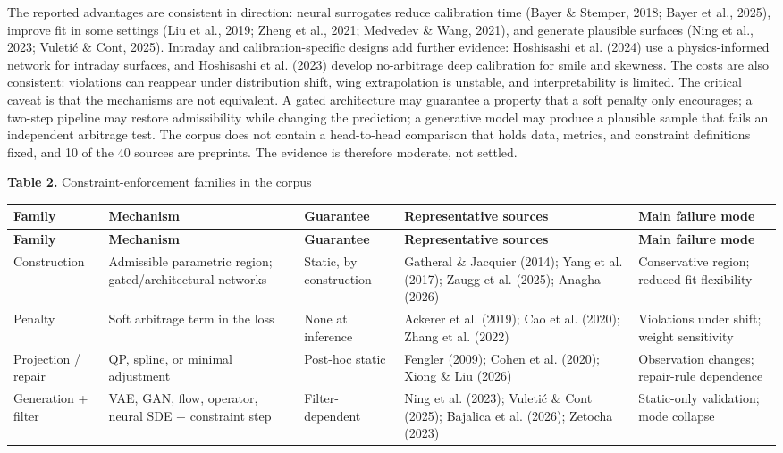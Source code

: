 \documentclass[11pt]{article}
\begin{document}
The reported advantages are consistent in direction: neural surrogates reduce calibration time (Bayer \& Stemper, 2018; Bayer et al., 2025), improve fit in some settings (Liu et al., 2019; Zheng et al., 2021; Medvedev \& Wang, 2021), and generate plausible surfaces (Ning et al., 2023; Vuletić \& Cont, 2025). Intraday and calibration-specific designs add further evidence: Hoshisashi et al. (2024) use a physics-informed network for intraday surfaces, and Hoshisashi et al. (2023) develop no-arbitrage deep calibration for smile and skewness. The costs are also consistent: violations can reappear under distribution shift, wing extrapolation is unstable, and interpretability is limited. The critical caveat is that the mechanisms are not equivalent. A gated architecture may guarantee a property that a soft penalty only encourages; a two-step pipeline may restore admissibility while changing the prediction; a generative model may produce a plausible sample that fails an independent arbitrage test. The corpus does not contain a head-to-head comparison that holds data, metrics, and constraint definitions fixed, and 10 of the 40 sources are preprints. The evidence is therefore moderate, not settled.

\textbf{Table 2.} Constraint-enforcement families in the corpus

\begingroup\small
\begin{longtable}{@{}p{}p{}p{}p{}p{}@{}}
\toprule
\textbf{Family} & \textbf{Mechanism} & \textbf{Guarantee} & \textbf{Representative sources} & \textbf{Main failure mode} \\
\midrule
\endfirsthead
\toprule
\textbf{Family} & \textbf{Mechanism} & \textbf{Guarantee} & \textbf{Representative sources} & \textbf{Main failure mode} \\
\midrule
\endhead
Construction & Admissible parametric region; gated/architectural networks & Static, by construction & Gatheral \& Jacquier (2014); Yang et al. (2017); Zaugg et al. (2025); Anagha (2026) & Conservative region; reduced fit flexibility \\
Penalty & Soft arbitrage term in the loss & None at inference & Ackerer et al. (2019); Cao et al. (2020); Zhang et al. (2022) & Violations under shift; weight sensitivity \\
Projection / repair & QP, spline, or minimal adjustment & Post-hoc static & Fengler (2009); Cohen et al. (2020); Xiong \& Liu (2026) & Observation changes; repair-rule dependence \\
Generation + filter & VAE, GAN, flow, operator, neural SDE + constraint step & Filter-dependent & Ning et al. (2023); Vuletić \& Cont (2025); Bajalica et al. (2026); Zetocha (2023) & Static-only validation; mode collapse \\
\bottomrule
\end{longtable}
\endgroup
\end{document}
